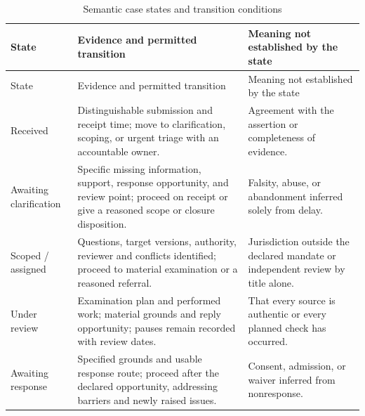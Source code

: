 \documentclass[11pt,a4paper]{article}
\begin{document}

\begin{longtable}{@{}L{0.19\textwidth}L{0.37\textwidth}L{0.34\textwidth}@{}}
\caption{Semantic case states and transition conditions}\label{tab:c210-states}\\
\toprule State & Evidence and permitted transition & Meaning not established by the state \\
\midrule\endfirsthead
\toprule State & Evidence and permitted transition & Meaning not established by the state \\
\midrule\endhead
Received & Distinguishable submission and receipt time; move to clarification, scoping, or urgent triage with an accountable owner. & Agreement with the assertion or completeness of evidence. \\
Awaiting clarification & Specific missing information, support, response opportunity, and review point; proceed on receipt or give a reasoned scope or closure disposition. & Falsity, abuse, or abandonment inferred solely from delay. \\
Scoped / assigned & Questions, target versions, authority, reviewer and conflicts identified; proceed to material examination or a reasoned referral. & Jurisdiction outside the declared mandate or independent review by title alone. \\
Under review & Examination plan and performed work; material grounds and reply opportunity; pauses remain recorded with review dates. & That every source is authentic or every planned check has occurred. \\
Awaiting response & Specified grounds and usable response route; proceed after the declared opportunity, addressing barriers and newly raised issues. & Consent, admission, or waiver inferred from nonresponse. \\

\end{longtable}
\end{document}
